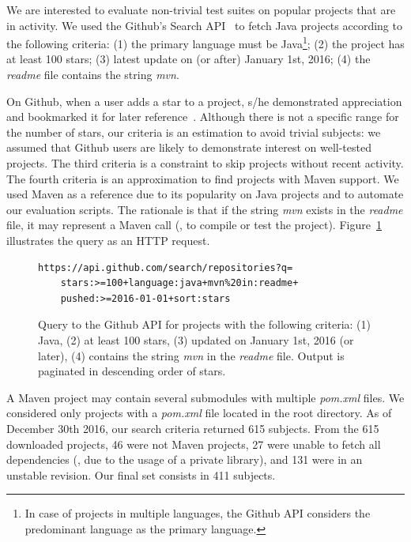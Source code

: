 We are interested to evaluate non-trivial test suites on popular
projects that are in activity. We used the Github's Search
API~\cite{githubsearch} to fetch Java projects according to the
following criteria: (1) the primary language must be Java\footnote{In
case of projects in multiple languages, the Github API considers the
predominant language as the primary language.}; (2) the project has at
least 100 stars; (3) latest update on (or after) January 1st, 2016;
(4) the \emph{readme} file contains the string \emph{mvn}.

On Github, when a user adds a star to a project, s/he demonstrated
appreciation and bookmarked it for later
reference~\cite{github-stars}.  Although there is not a specific range
for the number of stars, our criteria is an estimation to avoid
trivial subjects: we assumed that Github users are likely to
demonstrate interest on well-tested projects. The third criteria is a
constraint to skip projects without recent activity. The fourth
criteria is an approximation to find projects with Maven support. We
used Maven as a reference due to its popularity on Java projects and
to automate our evaluation scripts. The rationale is that if the
string \emph{mvn} exists in the \emph{readme} file, it may represent a
Maven call (\eg, to compile or test the project).
Figure~\ref{fig:subject-query} illustrates the query as an HTTP
request.

\begin{figure}[h!]
\centering
\scriptsize
{}
\begin{lstlisting}
https://api.github.com/search/repositories?q=
    stars:>=100+language:java+mvn%20in:readme+
    pushed:>=2016-01-01+sort:stars

\end{lstlisting}
\caption{\label{fig:subject-query} Query to the Github API for
    projects with the following criteria: (1) Java, (2) at least 100
    stars, (3) updated on January 1st, 2016 (or later), (4) contains
    the string \emph{mvn} in the \emph{readme} file. Output is
    paginated in descending order of stars.}
\end{figure}

\newcommand{\SubjCnt}{411}

A Maven project may contain several submodules with multiple
\emph{pom.xml} files. We considered only projects with a
\emph{pom.xml} file located in the root directory.  As of December
30th 2016, our search criteria returned 615 subjects. From the 615
downloaded projects, 46 were not Maven projects, 27 were unable to
fetch all dependencies (\eg, due to the usage of a private library),
and 131 were in an unstable revision. Our final set consists in
\SubjCnt{} subjects.

